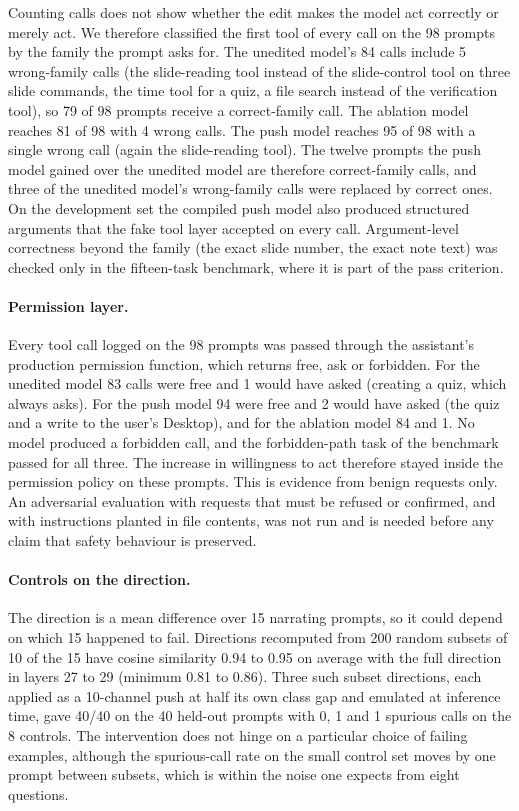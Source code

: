 \documentclass[11pt]{article}
\begin{document}
Counting calls does not show whether the edit makes the model act correctly or merely act. We therefore classified the first tool of every call on the 98 prompts by the family the prompt asks for. The unedited model's 84 calls include 5 wrong-family calls (the slide-reading tool instead of the slide-control tool on three slide commands, the time tool for a quiz, a file search instead of the verification tool), so 79 of 98 prompts receive a correct-family call. The ablation model reaches 81 of 98 with 4 wrong calls. The push model reaches 95 of 98 with a single wrong call (again the slide-reading tool). The twelve prompts the push model gained over the unedited model are therefore correct-family calls, and three of the unedited model's wrong-family calls were replaced by correct ones. On the development set the compiled push model also produced structured arguments that the fake tool layer accepted on every call. Argument-level correctness beyond the family (the exact slide number, the exact note text) was checked only in the fifteen-task benchmark, where it is part of the pass criterion.

\paragraph{Permission layer.} Every tool call logged on the 98 prompts was passed through the assistant's production permission function, which returns free, ask or forbidden. For the unedited model 83 calls were free and 1 would have asked (creating a quiz, which always asks). For the push model 94 were free and 2 would have asked (the quiz and a write to the user's Desktop), and for the ablation model 84 and 1. No model produced a forbidden call, and the forbidden-path task of the benchmark passed for all three. The increase in willingness to act therefore stayed inside the permission policy on these prompts. This is evidence from benign requests only. An adversarial evaluation with requests that must be refused or confirmed, and with instructions planted in file contents, was not run and is needed before any claim that safety behaviour is preserved.

\paragraph{Controls on the direction.} The direction is a mean difference over 15 narrating prompts, so it could depend on which 15 happened to fail. Directions recomputed from 200 random subsets of 10 of the 15 have cosine similarity 0.94 to 0.95 on average with the full direction in layers 27 to 29 (minimum 0.81 to 0.86). Three such subset directions, each applied as a 10-channel push at half its own class gap and emulated at inference time, gave 40/40 on the 40 held-out prompts with 0, 1 and 1 spurious calls on the 8 controls. The intervention does not hinge on a particular choice of failing examples, although the spurious-call rate on the small control set moves by one prompt between subsets, which is within the noise one expects from eight questions.
\end{document}
